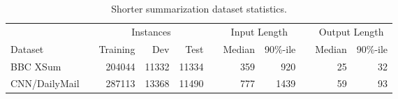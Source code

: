 \documentclass{article}
\begin{document}
\begin{table}
    \small
    \centering
    \begin{tabular}{@{}lrrrrrrrrrr@{}}
    \toprule
    & & \multicolumn{3}{c}{Instances} & & \multicolumn{2}{c}{Input Length}& & \multicolumn{2}{c}{Output  Length} \\
    \cmidrule{3-5} \cmidrule{7-8} \cmidrule{10-11}
    Dataset & & Training & Dev & Test & & Median & 90\%-ile & &  Median & 90\%-ile \\
    \midrule
       BBC XSum \citep{narayan2018don}  & &     204044 & 11332 & 11334 & &  359 & 920 & & 25 & 32 \\
       CNN/DailyMail  \citep{hermann2015teaching} & &  287113 & 13368 & 11490 & &   777 & 1439 & & 59 & 93 \\
    \bottomrule
    \end{tabular}
    \vspace{2mm}
    \caption{Shorter summarization dataset statistics.}
    \label{tab:sum_data}
\end{table}
\end{document}
